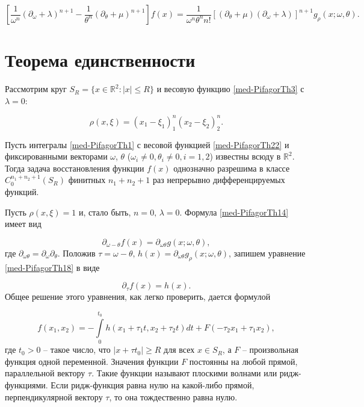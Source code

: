 \begin{equation}
\label{med-PifagorTh14}
\left[\frac{1}{\omega^n}(\partial_\omega +\lambda)^{n+1}-\frac{1}{\theta^n}(\partial_\theta +\mu)^{n+1}\right]f(x)=\frac{1}{\omega^n \theta^n n!}\left[(\partial_\theta+\mu)(\partial_\omega+\lambda)\right]^{n+1}g_\rho (x;\omega, \theta).
\end{equation}

\section{Теорема единственности}
Рассмотрим круг  $S_R=\{x\in\mathbb R^2: |x|\leq R\}$ и весовую функцию \eqref{med-PifagorTh3} с $\lambda=0$:

\begin{equation}
\label{med-PifagorTh22}
\rho(x,\xi)=(x_1-\xi_1)^n_1(x_2-\xi_2)^n_2.
\end{equation}

\begin{theorem}
Пусть интегралы \eqref{med-PifagorTh1} с весовой функцией \eqref{med-PifagorTh22} и фиксированными векторами $\omega$, $\theta$ ($\omega_i\neq 0, \theta_i\neq0, i=1,2$) известны всюду в $\mathbb R^2$. Тогда задача восстановления функции $f(x)$ однозначно разрешима в классе $C_0^{n_1+n_2+1}(S_R)$ финитных $n_1+n_2+1$ раз непрерывно дифференцируемых функций.
\end{theorem}

\begin{example}
Пусть $\rho(x,\xi)=1$ и, стало быть, $n=0,\, \lambda=0$. Формула \eqref{med-PifagorTh14} имеет вид
\end{example}

\begin{equation}
\label{med-PifagorTh18}\partial_{\omega-\theta}f(x)=\partial_{\omega\theta}g(x;\omega,\theta),\end{equation}
где $\partial_{\omega\theta}=\partial_\omega\partial_\theta$.
Положив $\tau=\omega-\theta, \, h(x)=\partial_{\omega\theta}g_\rho(x;\omega,\theta)$, запишем уравнение \eqref{med-PifagorTh18} в виде

\begin{equation}
\label{med-PifagorTh19}
\partial_{\tau}f(x)=h(x).
\end{equation}
Общее решение этого уравнения, как легко проверить, дается формулой

\begin{equation}
\label{med-PifagorTh20}
f(x_1, x_2)=-\int\limits_0^{t_0}h(x_1+\tau_1 t, x_2+\tau_2 t)dt+F(-\tau_2x_1+\tau_1x_2),
\end{equation}
где $t_0>0$ -- такое число, что $|x+\tau t_0|\geq R$ для всех $x\in S_R$, а  $F$ -- произвольная функция одной переменной. Значения  функции $F$ постоянны на любой прямой, параллельной вектору $\tau$. Такие функции называют плоскими волнами или ридж-функциями.  Если ридж-функция равна нулю на какой-либо прямой, перпендикулярной вектору $\tau$, то она тождественно равна нулю.

